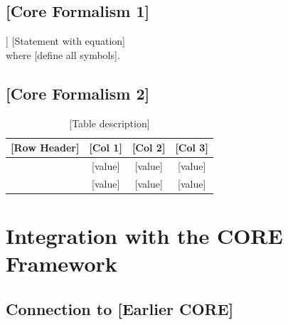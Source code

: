
\subsection{[Core Formalism 1]}

\begin{definition}[[Formal Concept]]
[Statement with equation]
\begin{equation}
[Equation]
\label{eq:[name]}
\end{equation}
where [define all symbols].
\end{definition}

\subsection{[Core Formalism 2]}

\begin{table}[h]
\centering
\begin{tabular}{lccc}
\toprule
\textbf{[Row Header]} & \textbf{[Col 1]} & \textbf{[Col 2]} & \textbf{[Col 3]} \\
\midrule
[Row 1] & [value] & [value] & [value] \\
[Row 2] & [value] & [value] & [value] \\
\bottomrule
\end{tabular}
\caption{[Table description]}
\label{tab:[name]}
\end{table}



\section{Integration with the CORE Framework}
\label{sec:[label]-integration}



\subsection{Connection to [Earlier CORE]}
\label{sec:[label]-connection1}


